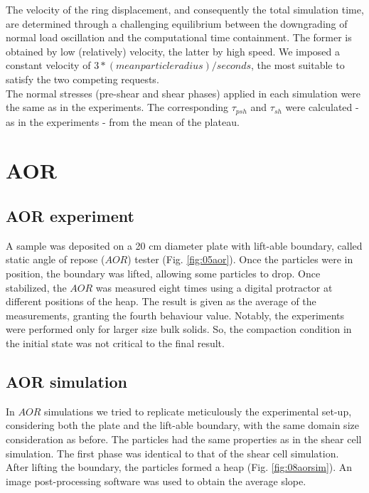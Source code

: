 \begin{appendix}
The velocity of the ring displacement, and consequently the total simulation time, are determined 
through a challenging equilibrium between the downgrading of normal load oscillation and the computational time containment. 
The former is obtained by low (relatively) velocity, the latter by high speed. We imposed a constant velocity 
of $3*(mean particle radius)/seconds$, the most suitable to satisfy the two competing requests. \\
The normal stresses (pre-shear and shear phases) applied in each simulation were the same as in the experiments. 
The corresponding $\tau_{psh}$ and $\tau_{sh}$ were calculated - as in the experiments - from the mean of the plateau.\\
 

\section{AOR}
\label{sec:AOR}

\subsection{AOR experiment}
\label{subsec:aorexperiment}
A sample was deposited on a 20 cm diameter plate with lift-able boundary, called static angle of repose ($AOR$) tester (Fig. \ref{fig:05aor}).
% 
Once the particles were in position, the boundary was lifted, allowing some particles to drop. 
Once stabilized, the $AOR$ was measured eight times using a digital protractor at different positions of the heap. 
The result is given as the average of the measurements, granting the fourth behaviour value.
Notably, the experiments were performed only for larger size bulk solids. 
So, the compaction condition in the initial state was not critical to the final result.



\subsection{AOR simulation}
\label{subsec:aorsimulation}
In $AOR$ simulations we tried to replicate meticulously the experimental set-up, 
considering both the plate and the lift-able boundary, with the same domain size consideration as before. 
The particles had the same properties as in the shear cell simulation. The first phase was identical to that of the shear cell simulation. 
After lifting the boundary, the particles formed a heap (Fig. \ref{fig:08aorsim}). 
%  
An image post-processing software was used to obtain the average slope.
 





\end{appendix}\